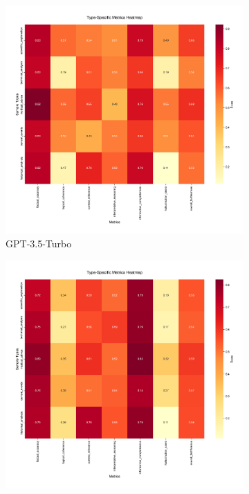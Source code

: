 \begin{figure}[!htbp]
\centering
\begin{subfigure}[b]{0.32\textwidth}
    \includegraphics[width=\textwidth]{figures/visualization/metrics_heatmap_gpt-3.5-turbo.png}
    \caption{GPT-3.5-Turbo}
    \label{fig:metrics_heatmap_gpt35}
\end{subfigure}
\hfill
\begin{subfigure}[b]{0.32\textwidth}
    \includegraphics[width=\textwidth]{figures/visualization/metrics_heatmap_gpt-4-turbo.png}

\end{subfigure}
\end{figure}
